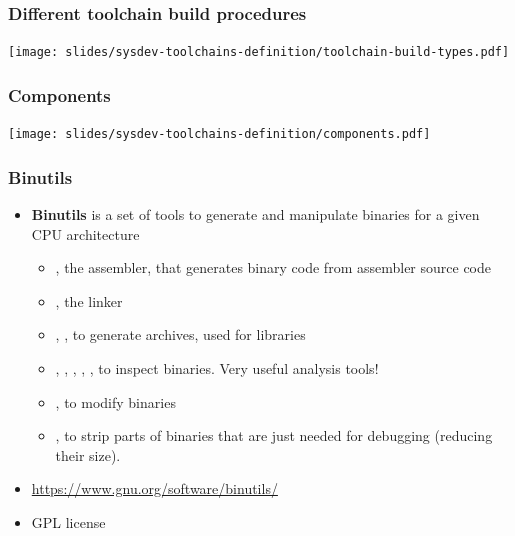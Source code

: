 \begin{frame}
  \frametitle{Different toolchain build procedures}
  \begin{center}
    \texttt{[image: slides/sysdev-toolchains-definition/toolchain-build-types.pdf]}
  \end{center}
\end{frame}

\begin{frame}
  \frametitle{Components}
  \begin{center}
    \texttt{[image: slides/sysdev-toolchains-definition/components.pdf]}
  \end{center}
\end{frame}

\begin{frame}
  \frametitle{Binutils}
  \begin{itemize}
  \item {\bf Binutils} is a set of tools to generate and manipulate
    binaries for a given CPU architecture
    \begin{itemize}
    \item {}, the assembler, that generates binary code from
      assembler source code
    \item {}, the linker
    \item {}, , to generate  archives,
      used for libraries
    \item {}, , , ,
      , to inspect binaries. Very useful analysis tools!
    \item {}, to modify binaries
    \item {}, to strip parts of binaries that are just needed
      for debugging (reducing their size).
    \end{itemize}
  \item \url{https://www.gnu.org/software/binutils/}
  \item GPL license
  \end{itemize}
\end{frame}

